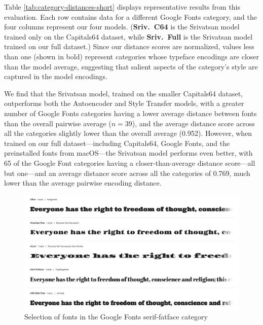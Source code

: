 Table \ref{tab:category-distances-short} displays representative results from this evaluation. Each row contains data for a different Google Fonts category, and the four columns represent our four models. (\textbf{Sriv.\ C64} is the Srivatsan model trained only on the Capitals64 dataset, while \textbf{Sriv.\ Full} is the Srivatsan model trained on our full dataset.) Since our distance scores are normalized, values less than one (shown in bold) represent categories whose typeface encodings are closer than the model average, suggesting that salient aspects of the category's style are captured in the model encodings.

We find that the Srivatsan model, trained on the smaller Capitals64 dataset, outperforms both the Autoencoder and Style Transfer models, with a greater number of Google Fonts categories having a lower average distance between fonts than the overall pairwise average ($n=39$), and the average distance score across all the categories slightly lower than the overall average (0.952). However, when trained on our full dataset---including Capitals64, Google Fonts, and the preinstalled fonts from macOS---the Srivatsan model performs even better, with 65 of the Google Font categories having a closer-than-average distance score---all but one---and an average distance score across all the categories of 0.769, much lower than the average pairwise encoding distance.

\begin{figure}[p]
    \centering
    \includegraphics[width=\textwidth]{images/serif-fatface.png}
    \caption{Selection of fonts in the Google Fonts serif-fatface category}
    \label{fig:serif-fatface}
\end{figure}

